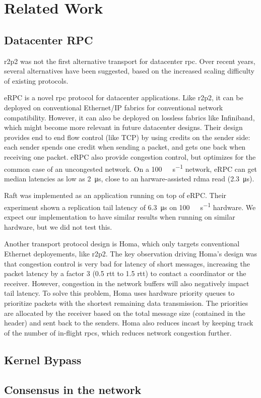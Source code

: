 \chapter{Related Work}\label{chap:related-work}

\section{Datacenter RPC}

\gls{r2p2} was not the first alternative transport for datacenter \gls{rpc}.
Over recent years, several alternatives have been suggested, based on the increased scaling difficulty of existing protocols.

eRPC\cite{erpc} is a novel \gls{rpc} protocol for datacenter applications.
Like \gls{r2p2}, it can be deployed on conventional Ethernet/IP fabrics for conventional network compatibility.
However, it can also be deployed on lossless fabrics like Infiniband, which might become more relevant in future datacenter designs.
Their design provides end to end flow control (like TCP) by using credits on the sender side: each sender spends one credit when sending a packet, and gets one back when receiving one packet.
eRPC also provide congestion control, but optimizes for the common case of an uncongested network.
On a \SI{100}{\giga\bit\per\second} network, eRPC can get median latencies as low as \SI{2}{\micro\second}, close to an harware-assisted \gls{rdma} read (\SI{2.3}{\micro\second}).

Raft was implemented as an application running on top of eRPC.
Their experiment shown a replication tail latency of \SI{6.3}{\micro\second} on \SI{100}{\giga\bit\per\second} hardware.
We expect our implementation to have similar results when running on similar hardware, but we did not test this.

Another transport protocol design is Homa\cite{homa}, which only targets conventional Ethernet deployements, like \gls{r2p2}.
The key observation driving Homa's design was that congestion control is very bad for latency of short messages, increasing the packet latency by a factor 3 (0.5 \gls{rtt} to 1.5 \gls{rtt}) to contact a coordinator or the receiver.
However, congestion in the network buffers will also negatively impact tail latency.
To solve this problem, Homa uses hardware priority queues to prioritize packets with the shortest remaining data transmission.
The priorities are allocated by the receiver based on the total message size (contained in the header) and sent back to the senders.
Homa also reduces incast by keeping track of the number of in-flight \glspl{rpc}, which reduces network congestion further.

\section{Kernel Bypass}


\section{Consensus in the network}
